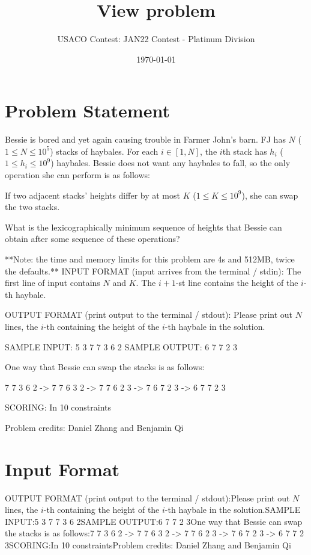 \documentclass[12pt]{article}
\title{View problem}
\author{USACO Contest: JAN22 Contest - Platinum Division}
\date{\today}
\begin{document}
\maketitle

\section*{Problem Statement}

Bessie is bored and yet again causing trouble in Farmer John's barn. FJ has $N$
($1\leq N \leq 10^5$) stacks of haybales. For each $i\in [1,N]$, the $i$th stack
has $h_i$ ($1\le h_i\le 10^9$) haybales. Bessie does not want any haybales to
fall, so the only operation she can perform is as follows:

If two adjacent stacks' heights differ by at most $K$ ($1\le K\le 10^9$),
she can swap the two stacks.

What is the lexicographically minimum sequence of heights that Bessie can obtain
after some sequence of these operations?

**Note: the time and memory limits for this problem are 4s and 512MB, twice
the defaults.**
INPUT FORMAT (input arrives from the terminal / stdin):
The first line of input contains $N$ and $K$. The $i+1$-st line contains the
height of the $i$-th haybale.

OUTPUT FORMAT (print output to the terminal / stdout):
Please print out $N$ lines, the $i$-th containing the height of the $i$-th
haybale in the solution.


SAMPLE INPUT:
5 3
7
7
3
6
2
SAMPLE OUTPUT: 
6
7
7
2
3

One way that Bessie can swap the stacks is as follows:


   7 7 3 6 2
-> 7 7 6 3 2
-> 7 7 6 2 3
-> 7 6 7 2 3
-> 6 7 7 2 3

SCORING:
In 10%
constraints


Problem credits: Daniel Zhang and Benjamin Qi



\section*{Input Format}
OUTPUT FORMAT (print output to the terminal / stdout):Please print out $N$ lines, the $i$-th containing the height of the $i$-th
haybale in the solution.SAMPLE INPUT:5 3
7
7
3
6
2SAMPLE OUTPUT:6
7
7
2
3One way that Bessie can swap the stacks is as follows:7 7 3 6 2
-> 7 7 6 3 2
-> 7 7 6 2 3
-> 7 6 7 2 3
-> 6 7 7 2 3SCORING:In 10%
constraintsProblem credits: Daniel Zhang and Benjamin Qi
\end{document}

